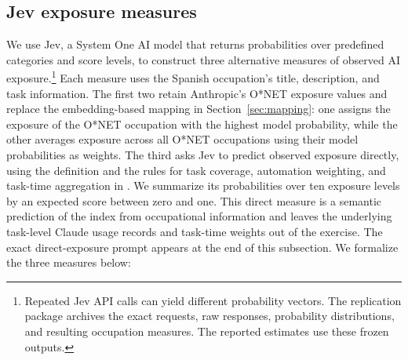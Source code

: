 \clearpage
\subsection*{Jev exposure measures}
\label{sec:appendix_od_jev}
We use Jev, a System One AI model that returns probabilities over predefined categories and score levels, to construct three alternative measures of observed AI exposure.\footnote{Repeated Jev API calls can yield different probability vectors. The replication package archives the exact requests, raw responses, probability distributions, and resulting occupation measures. The reported estimates use these frozen outputs.} Each measure uses the Spanish occupation's title, description, and task information. The first two retain Anthropic's O*NET exposure values and replace the embedding-based mapping in Section~\ref{sec:mapping}: one assigns the exposure of the O*NET occupation with the highest model probability, while the other averages exposure across all O*NET occupations using their model probabilities as weights. The third asks Jev to predict observed exposure directly, using the definition and the rules for task coverage, automation weighting, and task-time aggregation in \citet{massenkoff_mccrory_2026}. We summarize its probabilities over ten exposure levels by an expected score between zero and one. This direct measure is a semantic prediction of the index from occupational information and leaves the underlying task-level Claude usage records and task-time weights out of the exercise. The exact direct-exposure prompt appears at the end of this subsection. We formalize the three measures below:

